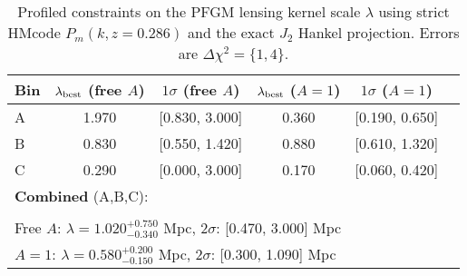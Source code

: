 \begin{table}[t]
\centering
\begin{tabular}{lccccc}
\hline
Bin & $\lambda_{\rm best}$ (free $A$) & $1\sigma$ (free $A$) & $\lambda_{\rm best}$ ($A{=}1$) & $1\sigma$ ($A{=}1$) \\
\hline
A & 1.970 & [0.830, 3.000] & 0.360 & [0.190, 0.650] \\
B & 0.830 & [0.550, 1.420] & 0.880 & [0.610, 1.320] \\
C & 0.290 & [0.000, 3.000] & 0.170 & [0.060, 0.420] \\
\hline
\multicolumn{5}{l}{\textbf{Combined} (A,B,C):}
\\[-0.6em]
\\
\multicolumn{5}{l}{Free $A$: $\lambda = 1.020^{+0.750}_{-0.340}$ Mpc, $2\sigma$: [0.470, 3.000] Mpc}\\
\multicolumn{5}{l}{$A{=}1$: $\lambda = 0.580^{+0.200}_{-0.150}$ Mpc, $2\sigma$: [0.300, 1.090] Mpc}\\
\hline
\end{tabular}
\caption{Profiled constraints on the PFGM lensing kernel scale $\lambda$ using strict HMcode $P_m(k,z{=}0.286)$ and the exact $J_2$ Hankel projection. Errors are $\Delta\chi^2=\{1,4\}$.}
\label{tab:lambda_constraints}
\end{table}
